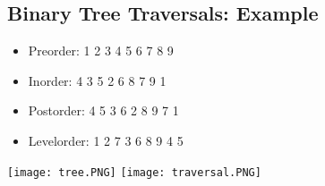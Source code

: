 \documentclass{article}
\begin{document}
\subsection{Binary Tree Traversals: Example}
    \begin{multicols}{2}
        \begin{itemize}
            \item Preorder: 1 2 3 4 5 6 7 8 9
            \item Inorder: 4 3 5 2 6 8 7 9 1
            \item Postorder: 4 5 3 6 2 8 9 7 1
            \item Levelorder: 1 2 7 3 6 8 9 4 5
        \end{itemize}
    \end{multicols}
\begin{center}
    \texttt{[image: tree.PNG]}
    \texttt{[image: traversal.PNG]}
\end{center}
\end{document}
